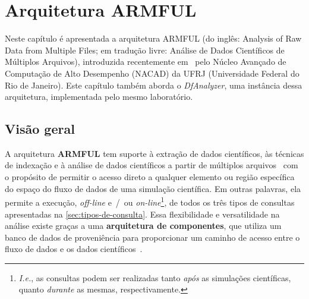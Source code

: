
\chapter{Arquitetura ARMFUL}%
\label{chap:arquitetura-armful}

Neste capítulo é apresentada a arquitetura  ARMFUL (do inglês: Analysis of Raw Data from Multiple Files; em tradução livre: Análise de Dados Científicos de Múltiplos Arquivos), introduzida recentemente em~\cite{silva2016situ,silva2017raw} pelo  Núcleo Avançado de Computação de Alto Desempenho (NACAD) da  UFRJ (Universidade Federal do Rio de Janeiro). Este capítulo também aborda o \textit{DfAnalyzer}, uma instância dessa arquitetura, implementada pelo mesmo laboratório.

\section{Visão geral}

A arquitetura \textbf{ARMFUL} tem suporte à extração de dados científicos, às técnicas de indexação e à análise de dados científicos a partir de múltiplos arquivos~\cite{silva2016situ} com o propósito de permitir o acesso direto a qualquer elemento ou região específica do espaço do fluxo de dados de uma simulação científica. Em outras palavras, ela permite a execução, \textit{off-line} e~/~ou \textit{on-line}\footnote{\textit{I.e.}, as consultas podem ser realizadas tanto \emph{após} as simulações científicas, quanto \emph{durante} as mesmas, respectivamente.}, de todos os três tipos de consultas apresentadas na \autoref{sec:tipos-de-consulta}. Essa flexibilidade e versatilidade na análise existe graças a uma \textbf{arquitetura de componentes}, que utiliza um banco de dados de proveniência para proporcionar um caminho de acesso entre o fluxo de dados e os dados científicos~\cite{silva2017raw}.

